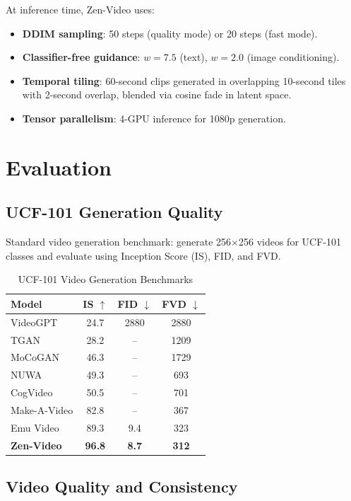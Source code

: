 \documentclass[11pt,a4paper]{article}
\begin{document}
At inference time, Zen-Video uses:
\begin{itemize}
    \item \textbf{DDIM sampling}: 50 steps (quality mode) or 20 steps (fast mode).
    \item \textbf{Classifier-free guidance}: $w = 7.5$ (text), $w = 2.0$ (image conditioning).
    \item \textbf{Temporal tiling}: 60-second clips generated in overlapping 10-second tiles
    with 2-second overlap, blended via cosine fade in latent space.
    \item \textbf{Tensor parallelism}: 4-GPU inference for 1080p generation.
\end{itemize}

\section{Evaluation}

\subsection{UCF-101 Generation Quality}

Standard video generation benchmark: generate 256$\times$256 videos for UCF-101 classes and
evaluate using Inception Score (IS), FID, and FVD.

\begin{table}[H]
\centering
\begin{tabular}{lccc}
\toprule
\textbf{Model} & \textbf{IS} $\uparrow$ & \textbf{FID} $\downarrow$ & \textbf{FVD} $\downarrow$ \\
\midrule
VideoGPT & 24.7 & 2880 & 2880 \\
TGAN & 28.2 & -- & 1209 \\
MoCoGAN & 46.3 & -- & 1729 \\
NUWA & 49.3 & -- & 693 \\
CogVideo & 50.5 & -- & 701 \\
Make-A-Video & 82.8 & -- & 367 \\
Emu Video & 89.3 & 9.4 & 323 \\
\textbf{Zen-Video} & \textbf{96.8} & \textbf{8.7} & \textbf{312} \\
\bottomrule
\end{tabular}
\caption{UCF-101 Video Generation Benchmarks}
\end{table}

\subsection{Video Quality and Consistency}
\end{document}

